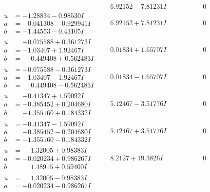 \documentclass[1p]{elsarticle_modified}
\theoremstyle{definition}
\begin{document}
$$\begin{array}{c|c|c}
 & \phantom{-}6.92152 - 7.81231 I & \phantom{-0.000000 } 0 \\ \hline\begin{aligned}
u &= -1.28834 - 0.98530 I \\
a &= -0.041308 - 0.929941 I \\
b &= -1.44553 - 0.43105 I\end{aligned}
 & \phantom{-}6.92152 + 7.81231 I & \phantom{-0.000000 } 0 \\ \hline\begin{aligned}
u &= -0.075588 + 0.361273 I \\
a &= -1.03407 + 1.92467 I \\
b &= \phantom{-}0.449408 + 0.562483 I\end{aligned}
 & \phantom{-}0.01834 + 1.65707 I & \phantom{-0.000000 } 0 \\ \hline\begin{aligned}
u &= -0.075588 - 0.361273 I \\
a &= -1.03407 - 1.92467 I \\
b &= \phantom{-}0.449408 - 0.562483 I\end{aligned}
 & \phantom{-}0.01834 - 1.65707 I & \phantom{-0.000000 } 0 \\ \hline\begin{aligned}
u &= -0.41347 + 1.59092 I \\
a &= -0.385452 + 0.204680 I \\
b &= -1.355160 + 0.184332 I\end{aligned}
 & \phantom{-}5.12467 - 3.51776 I & \phantom{-0.000000 } 0 \\ \hline\begin{aligned}
u &= -0.41347 - 1.59092 I \\
a &= -0.385452 - 0.204680 I \\
b &= -1.355160 - 0.184332 I\end{aligned}
 & \phantom{-}5.12467 + 3.51776 I & \phantom{-0.000000 } 0 \\ \hline\begin{aligned}
u &= \phantom{-}1.32005 + 0.98383 I \\
a &= -0.020234 + 0.986267 I \\
b &= \phantom{-}1.48915 + 0.59400 I\end{aligned}
 & \phantom{-}8.2127 + 19.3826 I & \phantom{-0.000000 } 0 \\ \hline\begin{aligned}
u &= \phantom{-}1.32005 - 0.98383 I \\
a &= -0.020234 - 0.986267 I \\

\end{aligned}
\end{array}$$
\end{document}
